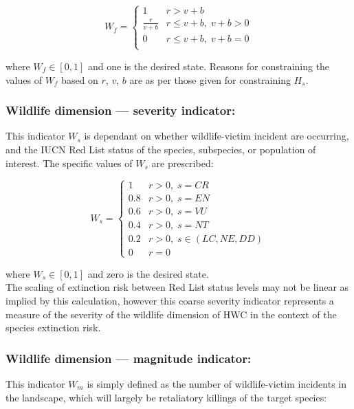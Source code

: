 \documentclass[fleqn,10pt]{olplainarticle}
\begin{document}
\begin{equation*}
    W_f = \begin{cases}
    1               & r > v + b \\
    \frac{r}{v + b} & r \le v + b,\; v + b > 0\\
    0               & r \le v + b,\; v + b = 0 \\
    \end{cases}
\end{equation*}

where $W_f \in [0,1]$ and one is the desired state. Reasons for constraining the values of $W_f$ based on $r$, $v$, $b$ are as per those given for constraining $H_s$.\\

\subsubsection*{Wildlife dimension --- severity indicator:}
This indicator $W_s$ is dependant on whether wildlife-victim incident are occurring, and the IUCN Red List status of the species, subspecies, or population of interest. The specific values of $W_s$ are prescribed:

\begin{equation*}
    W_s = \begin{cases}
    1   & r > 0, \; s = CR \\
    0.8 & r > 0, \; s = EN \\
    0.6 & r > 0, \; s = VU \\
    0.4 & r > 0, \; s = NT \\
    0.2 & r > 0, \; s \in (LC, NE, DD) \\
    0   & r = 0
    \end{cases}
\end{equation*}

where $W_s \in [0,1]$ and zero is the desired state.\\

The scaling of extinction risk between Red List status levels may not be linear as implied by this calculation, however this coarse severity indicator represents a measure of the severity of the wildlife dimension of HWC in the context of the species extinction risk.\\

\subsubsection*{Wildlife dimension --- magnitude indicator:}
This indicator $W_m$ is simply defined as the number of wildlife-victim incidents in the landscape, which will largely be retaliatory killings of the target species:
\end{document}
